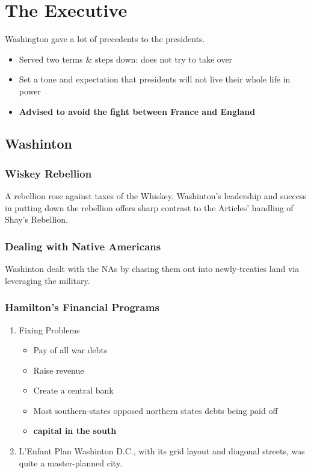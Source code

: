 \documentclass[11pt]{article}
\begin{document}
\section{The Executive}
\label{sec:org80620ac}
Washington gave a lot of precedents to the presidents.

\begin{itemize}
\item Served two terms \& steps down: does not try to take over
\item Set a tone and expectation that presidents will not live their whole life in power
\item \textbf{\textbf{Advised to avoid the fight between France and England}}
\end{itemize}

\subsection{Washinton}
\label{sec:org5fe6a31}

\subsubsection{Wiskey Rebellion}
\label{sec:orga4f44cf}
A rebellion rose against taxes of the Whiskey. Washinton's leadership and success in putting down the rebellion offers sharp contrast to the Articles' handling of Shay's Rebellion.

\subsubsection{Dealing with Native Americans}
\label{sec:org0ec6448}
Washinton dealt with the NAs by chasing them out into newly-treaties land via leveraging the military.

\subsubsection{Hamilton's Financial Programs}
\label{sec:orgba01361}

\begin{enumerate}
\item Fixing Problems
\label{sec:orgdb1f0b0}
\begin{itemize}
\item Pay of all war debts
\item Raise revenue
\item Create a central bank
\item Most southern-states opposed northern states debts being paid off
\item \textbf{\textbf{capital in the south}}
\end{itemize}

\item L'Enfant Plan
\label{sec:org7b21d0a}
Washinton D.C., with its grid layout and diagonal streets, was quite a master-planned city.
\end{enumerate}
\end{document}

